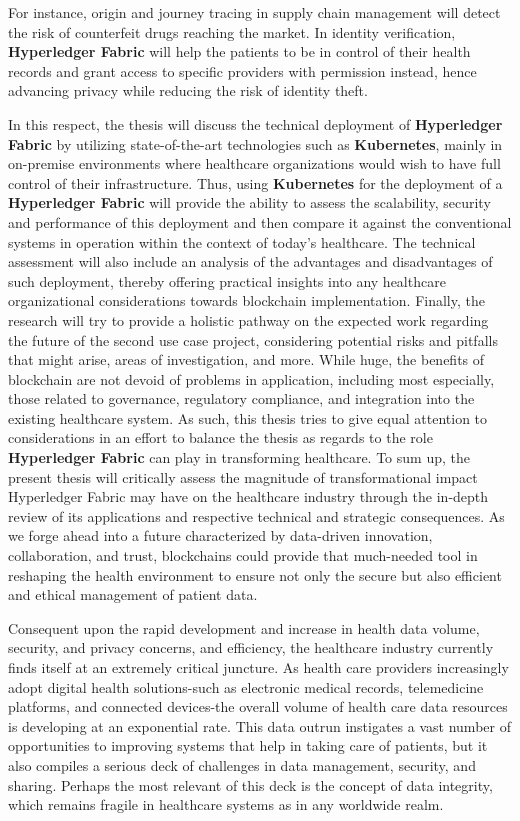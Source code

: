 For instance, origin and journey tracing in supply chain management will detect the risk of counterfeit drugs reaching the market. In identity verification, \textbf{Hyperledger Fabric} will help the patients to be in control of their health records and grant access to specific providers with permission instead, hence advancing privacy while reducing the risk of identity theft.

In this respect, the thesis will discuss the technical deployment of \textbf{Hyperledger Fabric} by utilizing state-of-the-art technologies such as \textbf{Kubernetes}, mainly in on-premise environments where healthcare organizations would wish to have full control of their infrastructure. Thus, using \textbf{Kubernetes} for the deployment of a \textbf{Hyperledger Fabric} will provide the ability to assess the scalability, security and performance of this deployment and then compare it against the conventional systems in operation within the context of today's healthcare. The technical assessment will also include an analysis of the advantages and disadvantages of such deployment, thereby offering practical insights into any healthcare organizational considerations towards blockchain implementation. Finally, the research will try to provide a holistic pathway on the expected work regarding the future of the second use case project, considering potential risks and pitfalls that might arise, areas of investigation, and more. While huge, the benefits of blockchain are not devoid of problems in application, including most especially, those related to governance, regulatory compliance, and integration into the existing healthcare system. As such, this thesis tries to give equal attention to considerations in an effort to balance the thesis as regards to the role \textbf{Hyperledger Fabric} can play in transforming healthcare. To sum up, the present thesis will critically assess the magnitude of transformational impact Hyperledger Fabric may have on the healthcare industry through the in-depth review of its applications and respective technical and strategic consequences. As we forge ahead into a future characterized by data-driven innovation, collaboration, and trust, blockchains could provide that much-needed tool in reshaping the health environment to ensure not only the secure but also efficient and ethical management of patient data.

Consequent upon the rapid development and increase in health data volume, security, and privacy concerns, and efficiency, the healthcare industry currently finds itself at an extremely critical juncture. As health care providers increasingly adopt digital health solutions-such as electronic medical records, telemedicine platforms, and connected devices-the overall volume of health care data resources is developing at an exponential rate. This data outrun instigates a vast number of  opportunities to improving systems that help in taking care of patients, but it also compiles a serious deck of challenges in data management, security, and sharing. Perhaps the most relevant of this deck is the concept of data integrity, which remains fragile in healthcare systems as in any worldwide realm.

